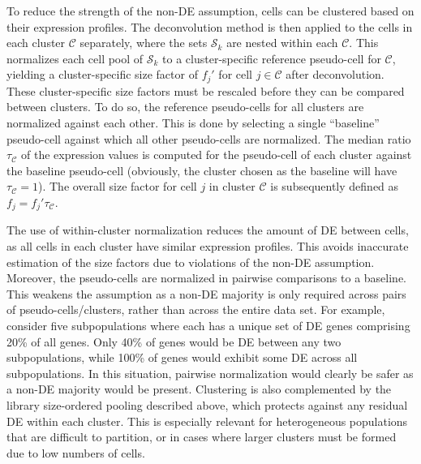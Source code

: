 \documentclass{bmcart}
\begin{document}
To reduce the strength of the non-DE assumption, cells can be clustered based on their expression profiles.
The deconvolution method is then applied to the cells in each cluster $\mathcal{C}$ separately,
    where the sets $\mathcal{S}_k$ are nested within each $\mathcal{C}$.
This normalizes each cell pool of $\mathcal{S}_k$ to a cluster-specific reference pseudo-cell for $\mathcal{C}$,
    yielding a cluster-specific size factor of $f_{j}'$ for cell $j \in \mathcal{C}$ after deconvolution.
These cluster-specific size factors must be rescaled before they can be compared between clusters.
To do so, the reference pseudo-cells for all clusters are normalized against each other.
This is done by selecting a single ``baseline'' pseudo-cell against which all other pseudo-cells are normalized.
The median ratio $\tau_{\mathcal{C}}$ of the expression values is computed for the pseudo-cell of each cluster against the baseline pseudo-cell
    (obviously, the cluster chosen as the baseline will have $\tau_{\mathcal{C}}=1$).
The overall size factor for cell $j$ in cluster $\mathcal{C}$ is subsequently defined as $f_j = f_{j}'\tau_{\mathcal{C}}$.


The use of within-cluster normalization reduces the amount of DE between cells, as all cells in each cluster have similar expression profiles.
This avoids inaccurate estimation of the size factors due to violations of the non-DE assumption.
Moreover, the pseudo-cells are normalized in pairwise comparisons to a baseline.
This weakens the assumption as a non-DE majority is only required across pairs of pseudo-cells/clusters, rather than across the entire data set.
For example, consider five subpopulations where each has a unique set of DE genes comprising 20\% of all genes.
Only 40\% of genes would be DE between any two subpopulations, while 100\% of genes would exhibit some DE across all subpopulations.
In this situation, pairwise normalization would clearly be safer as a non-DE majority would be present.
Clustering is also complemented by the library size-ordered pooling described above, which protects against any residual DE within each cluster.
This is especially relevant for heterogeneous populations that are difficult to partition, or in cases where larger clusters must be formed due to low numbers of cells.
\end{document}
